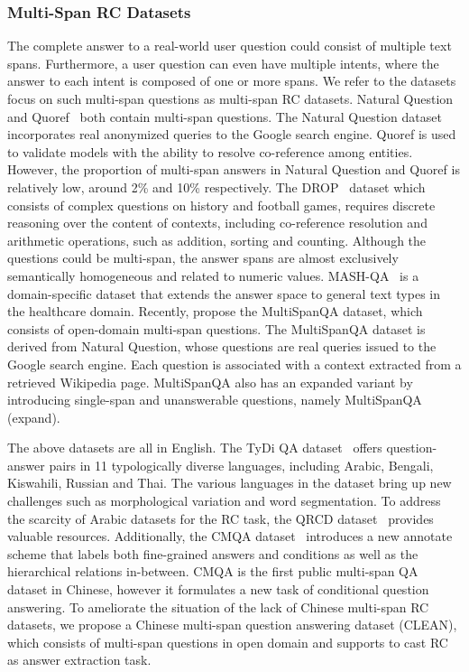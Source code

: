 \documentclass[a4paper]{cas-sc}
\newcommand{\1}[1]{\mathds{1}\left[#1\right]}
\begin{document}
\subsubsection{Multi-Span RC Datasets}
The complete answer to a real-world user question could consist of multiple text spans. 
Furthermore, a user question can even have multiple intents, where the answer to each intent is composed of one or more spans. 
We refer to the datasets focus on such multi-span questions as multi-span RC datasets.
Natural Question~\citep{DBLP:journals/tacl/KwiatkowskiPRCP19} and Quoref~\citep{DBLP:conf/emnlp/DasigiLMSG19} both contain multi-span questions. 
The Natural Question dataset incorporates real anonymized queries to the Google search engine. 
Quoref is used to validate models with the ability to resolve co-reference among entities. %
However, the proportion of multi-span answers in Natural Question and Quoref is relatively low, around 2\% and 10\% respectively. 
The DROP~\citep{DBLP:conf/naacl/DuaWDSS019} dataset which consists of complex questions on history and football games, requires discrete reasoning over the content of contexts, including  co-reference resolution and arithmetic operations, such as addition, sorting and counting. 
Although the questions could be multi-span, the answer spans are almost exclusively semantically homogeneous and related to numeric values. 
MASH-QA~\citep{DBLP:conf/aaai/PangLGXSC19} is a domain-specific dataset that extends the answer space to general text types in the healthcare domain.
Recently, \cite{li2022multispanqa} propose the MultiSpanQA dataset, which consists of open-domain multi-span questions. The MultiSpanQA dataset is derived from Natural Question, whose questions are real queries issued to the Google search engine. 
Each question is associated with a context extracted from a retrieved Wikipedia page.  
MultiSpanQA also has an expanded variant by introducing single-span and unanswerable questions, namely MultiSpanQA (expand). 

The above datasets are all in English. The TyDi QA dataset~\citep{DBLP:journals/tacl/ClarkPNCGCK20} offers question-answer pairs in 11 typologically diverse languages, including Arabic, Bengali, Kiswahili, Russian and Thai.  
The various languages in the dataset bring up new challenges such as morphological variation and word segmentation.
To address the scarcity of Arabic datasets for the RC task, the QRCD dataset~\citep{DBLP:journals/ipm/MalhasE22} provides valuable resources. 
Additionally, the CMQA dataset~\citep{DBLP:conf/coling/JuWZZ0022} introduces a new annotate scheme that labels both fine-grained answers and conditions  as well as the hierarchical relations in-between.
CMQA is the first public multi-span QA dataset in Chinese, 
however it formulates a new task of conditional question answering.
To ameliorate the situation of the lack of Chinese multi-span RC datasets, we propose a Chinese multi-span question answering dataset (CLEAN), which consists of multi-span questions in open domain and supports to cast RC as answer extraction task.
\end{document}
